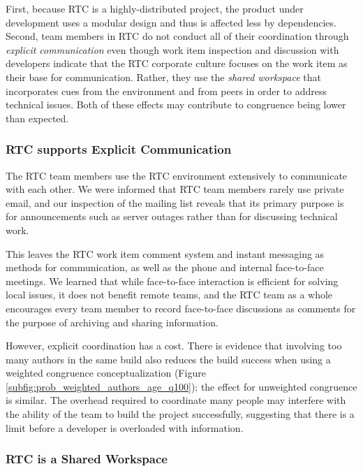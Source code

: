 \documentclass[12pt,oneside]{book}
\begin{document}
First, because RTC is a highly-distributed project, the product under development uses a modular design \cite{maccormack2006} and thus is affected less by dependencies. Second, team members in RTC do not conduct all of their coordination through \emph{explicit communication} even though work item inspection and discussion with developers indicate that the RTC corporate culture focuses on the work item as their base for communication. Rather, they use the \emph{shared workspace} that incorporates cues from the environment and from peers in order to address technical issues. Both of these effects may contribute to congruence being lower than expected.

\subsubsection{RTC supports Explicit Communication}

The RTC team members use the RTC environment extensively to communicate with each other. We were informed that RTC team members rarely use private email, and our inspection of the mailing list reveals that its primary purpose is for announcements such as server outages rather than for discussing technical work.

This leaves the RTC work item comment system and instant messaging as methods for communication, as well as the phone and internal face-to-face meetings.
We learned that while face-to-face interaction is efficient for solving local issues, it does not benefit remote teams, and the RTC team as a whole encourages every team member to record face-to-face discussions as comments for the purpose of archiving and sharing information.

However, explicit coordination has a cost. There is evidence that involving too many authors in the same build also reduces the build success when using a weighted congruence conceptualization (Figure \ref{subfig:prob_weighted_authors_age_q100}); the effect for unweighted congruence is similar. The overhead required to coordinate many people may interfere with the ability of the team to build the project successfully, suggesting that there is a limit before a developer is overloaded with information.

\subsubsection{RTC is a Shared Workspace}
\end{document}
